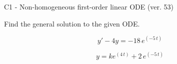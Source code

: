 \begin{exercise}
  \begin{exerciseTitle}C1 - Non-homogeneous first-order linear ODE (ver. 53)\end{exerciseTitle}
  \begin{exerciseStatement}
    
Find the general solution to the given ODE.

    
\[y'-4y= -18 \, e^{\left(-5 \, t\right)}\]

  \end{exerciseStatement}
  \begin{exerciseAnswer}
    
\[y= k e^{\left(4 \, t\right)} + 2 \, e^{\left(-5 \, t\right)}\]

  \end{exerciseAnswer}
\end{exercise}
